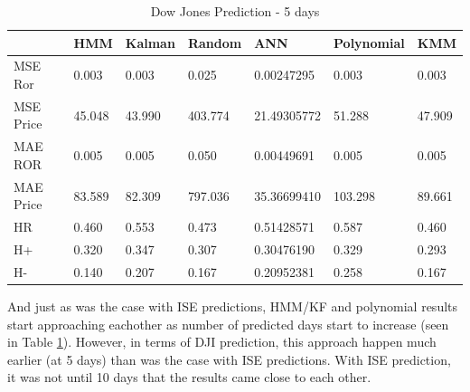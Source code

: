 \begin{table}[h]
\caption{\label{table5}Dow Jones Prediction - 5 days}
\vspace{0.3cm}
\begin{tabular}{|l|l|l|l|l|l|l|}
\hline
 &                  HMM &       Kalman &   Random &        ANN &     Polynomial &    KMM\\
\hline
   MSE Ror &      0.003 &      0.003 &      0.025 & 0.00247295 &      0.003 &      0.003\\
\hline
 MSE Price &     45.048 &     43.990 &    403.774 & 21.49305772 &     51.288 &     47.909\\
\hline
   MAE ROR &      0.005 &      0.005 &      0.050 & 0.00449691 &      0.005 &      0.005\\
\hline
 MAE Price &     83.589 &     82.309 &    797.036 & 35.36699410 &    103.298 &     89.661\\
\hline
        HR &      0.460 &      0.553 &      0.473 & 0.51428571 &      0.587 &      0.460\\
\hline
        H+ &      0.320 &      0.347 &      0.307 & 0.30476190 &      0.329 &      0.293\\
\hline
        H- &      0.140 &      0.207 &      0.167 & 0.20952381 &      0.258 &      0.167\\
\hline
\end{tabular}
\end{table}

And just as was the case with ISE predictions, HMM/KF and polynomial results
start approaching eachother as number of predicted days start to increase (seen
in Table \ref{table5}). However, in terms of DJI prediction, this approach
happen much earlier (at 5 days) than was the case with ISE predictions. With ISE
prediction, it was not until 10 days that the results came close to each other. 

